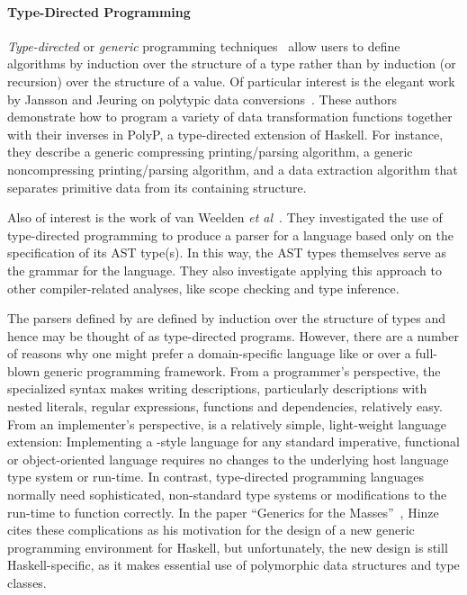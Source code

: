 \paragraph*{Type-Directed Programming}
{\em Type-directed} or
{\em generic} programming techniques~\cite{jansson+:97,jansson+:99,jansson:phdthesis,hinze+:generic-programming,jansson+:02,lammel+:syb} allow users to
define algorithms by induction over the structure of a type rather 
than by induction (or recursion) over the structure of a value.  
Of particular interest is the
elegant work by Jansson and Jeuring on polytypic data 
conversions~\cite{jansson+:97,jansson+:99,jansson:phdthesis,jansson+:02}.
These authors demonstrate how to program a variety of data 
transformation functions together with their inverses in PolyP, a 
type-directed extension of Haskell. For instance, they describe a 
generic compressing printing/parsing algorithm, a generic 
noncompressing printing/parsing algorithm, and a data
extraction algorithm that separates primitive data from its
containing structure.  

Also of interest is the work of 
van Weelden \textit{et al}~\cite{weelden+:polytypic-ast}.
They investigated the use of
type-directed programming to produce a parser for a language based only on
the specification of its AST type(s). In this way, the AST types
themselves serve as the grammar for the language. They also
investigate applying this approach to other compiler-related analyses,
like scope checking and type inference.

The parsers defined by \ddc{} are defined by induction over the structure
of types and hence may be thought of as type-directed programs.  However,
there are a number of reasons why one might prefer a domain-specific
language like \pads{} or \ddc{} over a full-blown
generic programming framework.  
From a programmer's perspective, the specialized syntax makes writing
descriptions, particularly descriptions with nested literals, 
regular expressions, functions and dependencies, relatively easy.
From an implementer's perspective, \pads{} is a
relatively simple, light-weight language extension:  Implementing a 
\pads{}-style language for any standard imperative, functional or 
object-oriented language requires no changes to the underlying host language
type system or run-time.  In contrast, type-directed
programming languages normally need sophisticated, non-standard type systems
or modifications to the run-time to function correctly.  In the
paper ``Generics for the Masses''~\cite{hinze:masses}, Hinze cites these
complications as his motivation for the design of a new generic programming
environment for Haskell, but unfortunately, the new design is still
Haskell-specific, as it makes essential use of polymorphic data
structures and type classes.  


